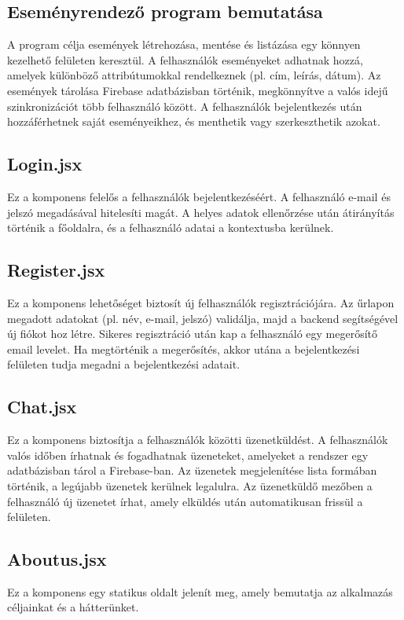 \documentclass[colorlinks]{thesis-kando}
\theoremstyle{definition}
\theoremstyle{remark}
\begin{document}
 \subsection{Eseményrendező program bemutatása}
 A program célja események létrehozása, mentése és listázása egy könnyen kezelhető felületen keresztül. A felhasználók eseményeket adhatnak hozzá, amelyek különböző attribútumokkal rendelkeznek (pl. cím, leírás, dátum). Az események tárolása Firebase adatbázisban történik, megkönnyítve a valós idejű szinkronizációt több felhasználó között. A felhasználók bejelentkezés után hozzáférhetnek saját eseményeikhez, és menthetik vagy szerkeszthetik azokat.
 
 \subsection{Login.jsx}
 Ez a komponens felelős a felhasználók bejelentkezéséért. A felhasználó e-mail és jelszó megadásával hitelesíti magát. A helyes adatok ellenőrzése után átirányítás történik a főoldalra, és a felhasználó adatai a kontextusba kerülnek.
 
 \subsection{Register.jsx}
 Ez a komponens lehetőséget biztosít új felhasználók regisztrációjára. Az űrlapon megadott adatokat (pl. név, e-mail, jelszó) validálja, majd a backend segítségével új fiókot hoz létre. Sikeres regisztráció után kap a felhasználó egy megerősítő email levelet. Ha megtörténik a megerősítés, akkor utána a bejelentkezési felületen tudja megadni a bejelentkezési adatait.
 
 \subsection{Chat.jsx}
 Ez a komponens biztosítja a felhasználók közötti üzenetküldést. A felhasználók valós időben írhatnak és fogadhatnak üzeneteket, amelyeket a rendszer egy adatbázisban tárol a Firebase-ban. Az üzenetek megjelenítése lista formában történik, a legújabb üzenetek kerülnek legalulra. Az üzenetküldő mezőben a felhasználó új üzenetet írhat, amely elküldés után automatikusan frissül a felületen.
 
 \subsection{Aboutus.jsx}
 Ez a komponens egy statikus oldalt jelenít meg, amely bemutatja az alkalmazás céljainkat és a hátterünket.
 
\end{document}
